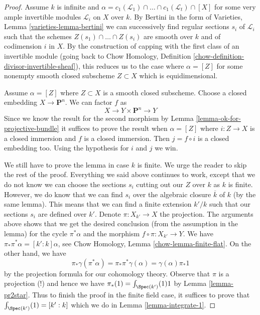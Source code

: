 \begin{proof}
\medskip\noindent
Assume $k$ is infinite and $\alpha = 
c_1(\mathcal{L}_1) \cap \ldots \cap c_1(\mathcal{L}_t) \cap [X]$
for some very ample invertible modules $\mathcal{L}_i$ on $X$ over $k$.
By Bertini in the form of Varieties, Lemma \ref{varieties-lemma-bertini}
we can successively find regular sections $s_i$ of $\mathcal{L}_i$
such that the schemes $Z(s_1) \cap \ldots \cap Z(s_i)$
are smooth over $k$ and of codimension $i$ in $X$.
By the construction of capping with the first class of
an invertible module (going back to
Chow Homology, Definition \ref{chow-definition-divisor-invertible-sheaf}),
this reduces us to the case where $\alpha = [Z]$
for some nonempty smooth closed subscheme $Z \subset X$ which
is equidimensional.

\medskip\noindent
Assume $\alpha = [Z]$ where $Z \subset X$ is a smooth closed subscheme.
Choose a closed embedding $X \to \mathbf{P}^n$. We can factor $f$ as
$$
X \to Y \times \mathbf{P}^n \to Y
$$
Since we know the result for the second morphism by
Lemma \ref{lemma-ok-for-projective-bundle}
it suffices to prove the result when
$\alpha = [Z]$ where $i : Z \to X$ is a closed immersion 
and $f$ is a closed immersion.
Then $j = f \circ i$ is a closed embedding too.
Using the hypothesis for $i$ and $j$ we win.

\medskip\noindent
We still have to prove the lemma in case $k$ is finite. We urge the
reader to skip the rest of the proof. Everything we said above continues
to work, except that we do not know we can choose the sections
$s_i$ cutting out our $Z$ over $k$ as $k$ is finite. However, we do
know that we can find $s_i$ over the algebraic closure $\overline{k}$
of $k$ (by the same lemma). This means that we can
find a finite extension $k'/k$ such that our sections $s_i$
are defined over $k'$. Denote $\pi : X_{k'} \to X$ the projection.
The arguments above shows that we get the desired conclusion
(from the assumption in the lemma)
for the cycle $\pi^*\alpha$ and the morphism
$f \circ \pi : X_{k'} \to Y$.
We have $\pi_*\pi^*\alpha = [k' : k] \alpha$, see
Chow Homology, Lemma \ref{chow-lemma-finite-flat}.
On the other hand, we have
$$
\pi_*\gamma(\pi^*\alpha) = \pi_*\pi^*\gamma(\alpha) =
\gamma(\alpha) \pi_*1
$$
by the projection formula for our cohomology theory. Observe
that $\pi$ is a projection (!) and hence we have
$\pi_*(1) = \int_{\Spec(k')}(1) 1$ by
Lemma \ref{lemma-pr2star}. Thus to finish the proof in the
finite field case, it suffices to prove that
$\int_{\Spec(k')}(1) = [k' : k]$ which we do in
Lemma \ref{lemma-integrate-1}.
\end{proof}

